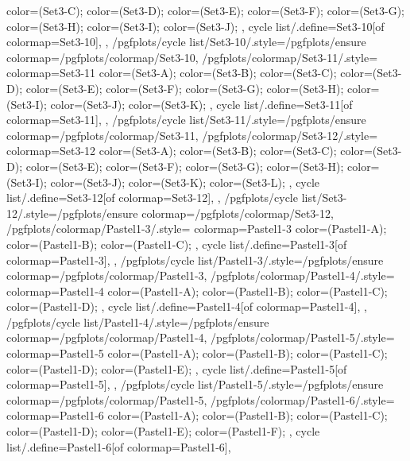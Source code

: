 {{{      color=(Set3-C);
      color=(Set3-D);
      color=(Set3-E);
      color=(Set3-F);
      color=(Set3-G);
      color=(Set3-H);
      color=(Set3-I);
      color=(Set3-J);
    },
    cycle list/.define={Set3-10}{[of colormap=Set3-10]},
  },
  /pgfplots/cycle list/Set3-10/.style={/pgfplots/ensure colormap={/pgfplots/colormap/Set3-10}},
  /pgfplots/colormap/Set3-11/.style={
    colormap={Set3-11}{
      color=(Set3-A);
      color=(Set3-B);
      color=(Set3-C);
      color=(Set3-D);
      color=(Set3-E);
      color=(Set3-F);
      color=(Set3-G);
      color=(Set3-H);
      color=(Set3-I);
      color=(Set3-J);
      color=(Set3-K);
    },
    cycle list/.define={Set3-11}{[of colormap=Set3-11]},
  },
  /pgfplots/cycle list/Set3-11/.style={/pgfplots/ensure colormap={/pgfplots/colormap/Set3-11}},
  /pgfplots/colormap/Set3-12/.style={
    colormap={Set3-12}{
      color=(Set3-A);
      color=(Set3-B);
      color=(Set3-C);
      color=(Set3-D);
      color=(Set3-E);
      color=(Set3-F);
      color=(Set3-G);
      color=(Set3-H);
      color=(Set3-I);
      color=(Set3-J);
      color=(Set3-K);
      color=(Set3-L);
    },
    cycle list/.define={Set3-12}{[of colormap=Set3-12]},
  },
  /pgfplots/cycle list/Set3-12/.style={/pgfplots/ensure colormap={/pgfplots/colormap/Set3-12}},
  /pgfplots/colormap/Pastel1-3/.style={
    colormap={Pastel1-3}{
      color=(Pastel1-A);
      color=(Pastel1-B);
      color=(Pastel1-C);
    },
    cycle list/.define={Pastel1-3}{[of colormap=Pastel1-3]},
  },
  /pgfplots/cycle list/Pastel1-3/.style={/pgfplots/ensure colormap={/pgfplots/colormap/Pastel1-3}},
  /pgfplots/colormap/Pastel1-4/.style={
    colormap={Pastel1-4}{
      color=(Pastel1-A);
      color=(Pastel1-B);
      color=(Pastel1-C);
      color=(Pastel1-D);
    },
    cycle list/.define={Pastel1-4}{[of colormap=Pastel1-4]},
  },
  /pgfplots/cycle list/Pastel1-4/.style={/pgfplots/ensure colormap={/pgfplots/colormap/Pastel1-4}},
  /pgfplots/colormap/Pastel1-5/.style={
    colormap={Pastel1-5}{
      color=(Pastel1-A);
      color=(Pastel1-B);
      color=(Pastel1-C);
      color=(Pastel1-D);
      color=(Pastel1-E);
    },
    cycle list/.define={Pastel1-5}{[of colormap=Pastel1-5]},
  },
  /pgfplots/cycle list/Pastel1-5/.style={/pgfplots/ensure colormap={/pgfplots/colormap/Pastel1-5}},
  /pgfplots/colormap/Pastel1-6/.style={
    colormap={Pastel1-6}{
      color=(Pastel1-A);
      color=(Pastel1-B);
      color=(Pastel1-C);
      color=(Pastel1-D);
      color=(Pastel1-E);
      color=(Pastel1-F);
    },
    cycle list/.define={Pastel1-6}{[of colormap=Pastel1-6]},
}}
